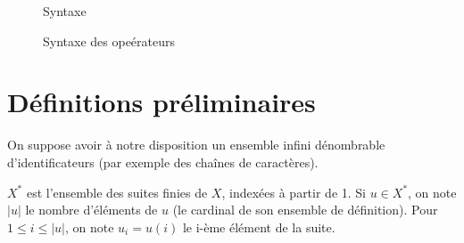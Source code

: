 \begin{figure}


  \caption{Syntaxe}
  \label{fig:stx}
\end{figure}

\begin{figure}


  \caption{Syntaxe des opeérateurs}
  \label{fig:stx-ops}
\end{figure}

\section{Définitions préliminaires}

On suppose avoir à notre disposition un ensemble infini dénombrable
d'identificateurs \sId (par exemple des chaînes de caractères).

$X^*$ est l'ensemble des suites finies de $X$, indexées à partir de 1. Si $u ∈
X^*$, on note $|u|$ le nombre d'éléments de $u$ (le cardinal de son ensemble de
définition). Pour $1 ≤ i ≤ |u|$, on note $u_i = u(i)$ le i-ème élément de la
suite.

